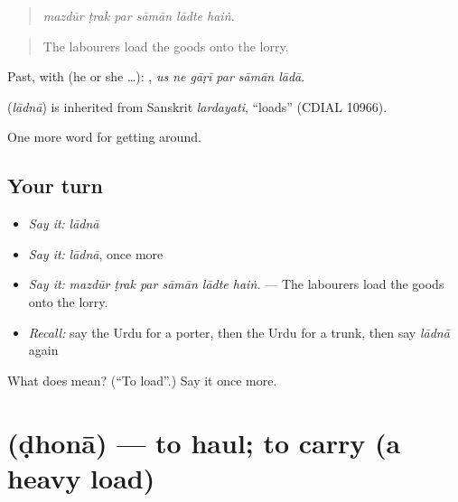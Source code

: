 \begin{quote}
     
\end{quote}

\begin{quote}
\emph{mazdūr ṭrak par sāmān lādte haiṅ.}
\end{quote}

\begin{quote}
The labourers load the goods onto the lorry.
\end{quote}

Past, with  (he or she …):      , \emph{us ne gāṛī par sāmān lādā}.

\begin{cousinweb}
\textbf{} (\emph{lādnā}) is inherited from Sanskrit \emph{lardayati}, \textquotedblleft{}loads\textquotedblright{} (CDIAL 10966).
\end{cousinweb}

\begin{grammarlens}[title={What you've built}]
One more word for getting around.
\end{grammarlens}

\subsection*{Your turn}
\begin{itemize}
\raggedright
  \item \emph{Say it:} \emph{lādnā}
  \item \emph{Say it:} \emph{lādnā}, once more
  \item \emph{Say it:} \emph{mazdūr ṭrak par sāmān lādte haiṅ.} — The labourers load the goods onto the lorry.
  \item \emph{Recall:} say the Urdu for a porter, then the Urdu for a trunk, then say \emph{lādnā} again
\end{itemize}

\begin{tcolorbox}[breakable,colback=teal!4,colframe=teal!35!black,title={Before you move on}]
What does  mean? (\textquotedblleft{}To load\textquotedblright{}.) Say it once more.
\end{tcolorbox}
\section[\texorpdfstring{\ur{ڈھونا} (ḍhonā)}{ڈھونا (ḍhonā)}]{ (ḍhonā) — to haul; to carry (a heavy load)}

